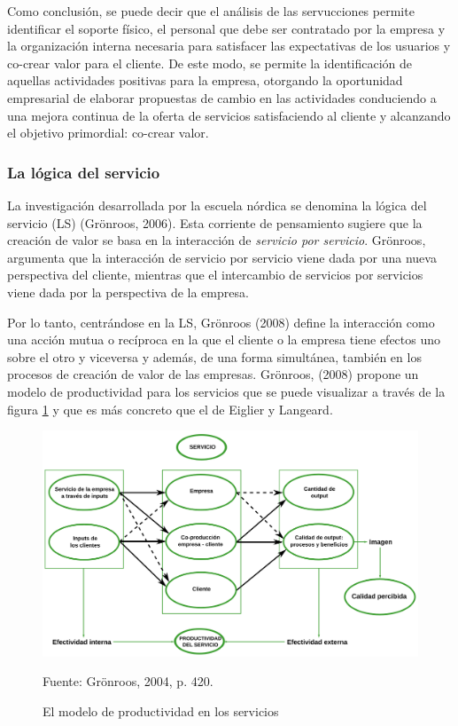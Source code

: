Como conclusión, se puede decir que el análisis de las servucciones permite identificar el soporte físico, el personal que debe ser contratado por la empresa y la organización interna necesaria para satisfacer las expectativas de los usuarios y co-crear valor para el cliente. De este modo, se permite la identificación de aquellas actividades positivas para la empresa, otorgando la oportunidad empresarial de elaborar propuestas de cambio en las actividades conduciendo a una mejora continua de la oferta de servicios satisfaciendo al cliente y alcanzando el objetivo primordial: co-crear valor.

\subsubsection{La lógica del servicio}

La investigación desarrollada por la escuela nórdica se denomina la lógica del servicio (LS) (Grönroos, 2006). Esta corriente de pensamiento sugiere que la creación de valor se basa en la interacción de \emph{servicio por servicio}. Grönroos, argumenta que la interacción de servicio por servicio viene dada por una nueva perspectiva del cliente, mientras que el intercambio de servicios por servicios viene dada por la perspectiva de la empresa.

Por lo tanto, centrándose en la LS, Grönroos (2008) define la interacción como una acción mutua o recíproca en la que el cliente o la empresa tiene efectos uno sobre el otro y viceversa y además, de una forma simultánea, también en los procesos de creación de valor de las empresas. Grönroos, (2008) propone un modelo de productividad para los servicios que se puede visualizar a través de la figura \ref{fig:procesoProductivoServiciosGronroos} y que es más concreto que el de Eiglier y Langeard.

\begin{figure}[!h]
	\caption{El modelo de productividad en los servicios}
	\centering \includegraphics[width=150mm]{capitulos/graficos/procesoProductivoServiciosGronroos} 
	\label{fig:procesoProductivoServiciosGronroos} 

	\footnotesize
		Fuente: Grönroos, 2004, p. 420.
\end{figure}

